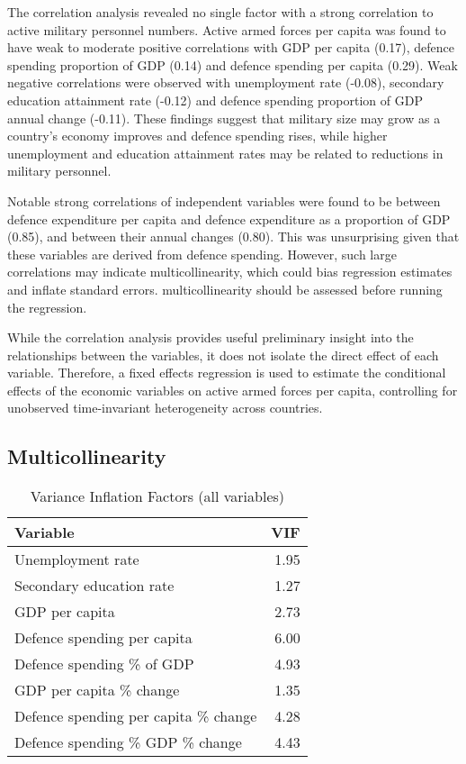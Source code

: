 The correlation analysis revealed no single factor with a strong correlation to active military personnel numbers.
Active armed forces per capita was found to have weak to moderate positive correlations with GDP per 
capita (0.17), defence spending proportion of GDP (0.14) and defence spending per capita (0.29).
Weak negative correlations were observed with unemployment rate
(-0.08), secondary education attainment rate (-0.12) and defence spending proportion of GDP annual 
change (-0.11). These findings suggest that military size may grow as a country's economy improves 
and defence spending rises, while higher unemployment and education attainment rates may be related 
to reductions in military personnel.

Notable strong correlations of independent variables were found to be between defence expenditure per capita and 
defence expenditure as a proportion of GDP (0.85), and between their annual changes (0.80). 
This was unsurprising given that these variables are derived from defence spending. 
However, such large correlations may indicate multicollinearity, which could 
bias regression estimates and inflate standard errors. multicollinearity should be 
assessed before running the regression.

While the correlation analysis provides useful preliminary insight into the relationships between 
the variables, it does not isolate the direct effect of each variable. Therefore, a 
fixed effects regression is used to estimate the conditional effects of the economic variables 
on active armed forces per capita, controlling for unobserved time-invariant heterogeneity 
across countries.

\subsection{Multicollinearity}

\begin{table}[ht]
\small
\centering
\caption{Variance Inflation Factors (all variables)}
\begin{tabularx}{\textwidth}{l r}
\toprule
\textbf{Variable} & \textbf{VIF} \\
\midrule
Unemployment rate & 1.95 \\
Secondary education rate & 1.27 \\
GDP per capita & 2.73 \\
Defence spending per capita & 6.00 \\
Defence spending \% of GDP & 4.93 \\
GDP per capita \% change & 1.35 \\
Defence spending per capita \% change & 4.28 \\
Defence spending \% GDP \% change & 4.43 \\
\bottomrule
\end{tabularx}
\label{tab:multicollinearity_full}
\end{table}

